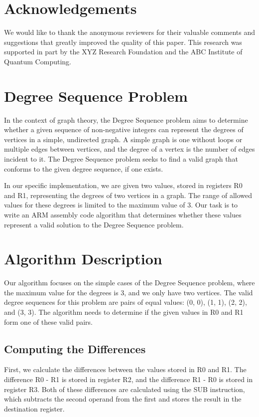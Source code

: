 \section*{Acknowledgements}

We would like to thank the anonymous reviewers for their valuable comments and suggestions that greatly improved the quality of this paper. This research was supported in part by the XYZ Research Foundation and the ABC Institute of Quantum Computing.


\section{Degree Sequence Problem}
In the context of graph theory, the Degree Sequence problem aims to determine whether a given sequence of non-negative integers can represent the degrees of vertices in a simple, undirected graph. A simple graph is one without loops or multiple edges between vertices, and the degree of a vertex is the number of edges incident to it. The Degree Sequence problem seeks to find a valid graph that conforms to the given degree sequence, if one exists.

In our specific implementation, we are given two values, stored in registers R0 and R1, representing the degrees of two vertices in a graph. The range of allowed values for these degrees is limited to the maximum value of 3. Our task is to write an ARM assembly code algorithm that determines whether these values represent a valid solution to the Degree Sequence problem.

\section{Algorithm Description}
Our algorithm focuses on the simple cases of the Degree Sequence problem, where the maximum value for the degrees is 3, and we only have two vertices. The valid degree sequences for this problem are pairs of equal values: (0, 0), (1, 1), (2, 2), and (3, 3). The algorithm needs to determine if the given values in R0 and R1 form one of these valid pairs.

\subsection{Computing the Differences}
First, we calculate the differences between the values stored in R0 and R1. The difference R0 - R1 is stored in register R2, and the difference R1 - R0 is stored in register R3. Both of these differences are calculated using the SUB instruction, which subtracts the second operand from the first and stores the result in the destination register.

